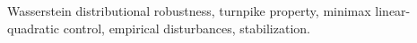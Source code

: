 \documentclass[10pt,journal,twoside]{IEEEtran}
\theoremstyle{definition}
\theoremstyle{remark}
\begin{document}
\begin{abstract}

\end{abstract}
\begin{IEEEkeywords}
	Wasserstein distributional robustness, turnpike property, minimax linear-quadratic control, empirical disturbances, stabilization.
\end{IEEEkeywords}
\end{document}
